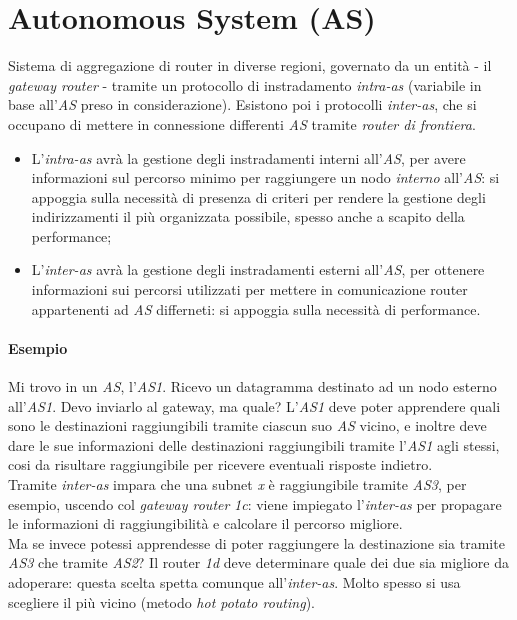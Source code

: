 \section{Autonomous System (AS)}
Sistema di aggregazione di router in diverse regioni, governato da un entità - il \textit{gateway router} - tramite un protocollo di instradamento \textit{intra-as} (variabile in base all'\textit{AS} preso in considerazione).
Esistono poi i protocolli \textit{inter-as}, che si occupano di mettere in connessione differenti \textit{AS} tramite \textit{router di frontiera}. \\
\begin{itemize}
	\item L'\textit{intra-as} avrà la gestione degli instradamenti interni all'\textit{AS}, per avere informazioni sul percorso minimo per raggiungere un nodo \textit{interno} all'\textit{AS}: si appoggia sulla necessità di presenza di criteri per rendere la gestione degli indirizzamenti il più organizzata possibile, spesso anche a scapito della performance;
	\item L'\textit{inter-as} avrà la gestione degli instradamenti esterni all'\textit{AS}, per ottenere informazioni sui percorsi utilizzati per mettere in comunicazione router appartenenti ad \textit{AS} differneti: si appoggia sulla necessità di performance.
\end{itemize}

\paragraph{Esempio}
Mi trovo in un \textit{AS}, l'\textit{AS1}. Ricevo un datagramma destinato ad un nodo esterno all'\textit{AS1}. Devo inviarlo al gateway, ma quale? L'\textit{AS1} deve poter apprendere quali sono le destinazioni raggiungibili tramite ciascun suo \textit{AS} vicino, e inoltre deve dare le sue informazioni delle destinazioni raggiungibili tramite l'\textit{AS1} agli stessi, cosi da risultare raggiungibile per ricevere eventuali risposte indietro. \\
Tramite \textit{inter-as} impara che una subnet \textit{x} è raggiungibile tramite \textit{AS3}, per esempio, uscendo col \textit{gateway router} \textit{1c}: viene impiegato l'\textit{inter-as} per propagare le informazioni di raggiungibilità e calcolare il percorso migliore. \\
Ma se invece potessi apprendesse di poter raggiungere la destinazione sia tramite \textit{AS3} che tramite \textit{AS2}? Il router \textit{1d} deve determinare quale dei due sia migliore da adoperare: questa scelta spetta comunque all'\textit{inter-as}. Molto spesso si usa scegliere il più vicino (metodo \textit{hot potato routing}).

